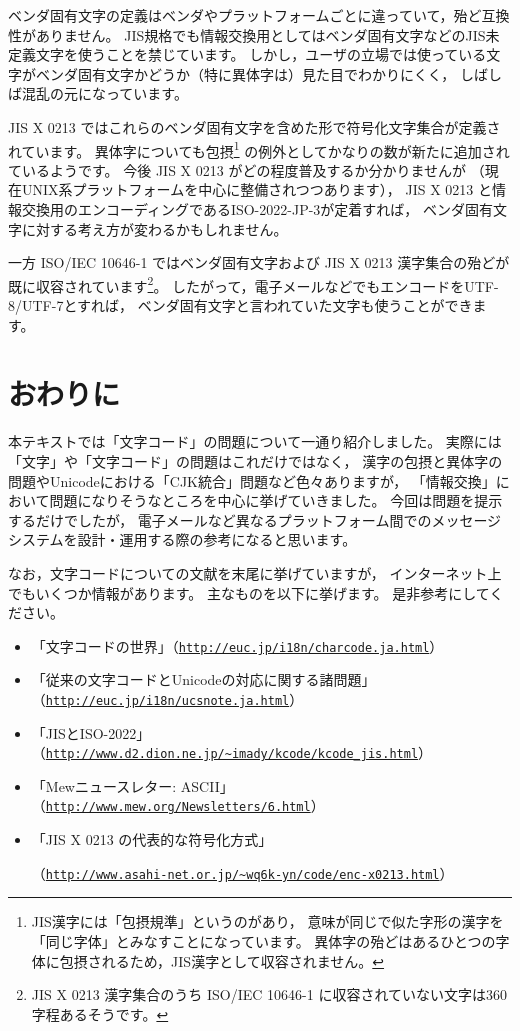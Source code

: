 \documentclass[a4j,10pt,fleqn]{jsarticle}
\begin{document}
ベンダ固有文字の定義はベンダやプラットフォームごとに違っていて，殆ど互換性がありません。
JIS規格でも情報交換用としてはベンダ固有文字などのJIS未定義文字を使うことを禁じています。
しかし，ユーザの立場では使っている文字がベンダ固有文字かどうか（特に異体字は）見た目でわかりにくく，
しばしば混乱の元になっています。

JIS X 0213 ではこれらのベンダ固有文字を含めた形で符号化文字集合が定義されています。
異体字についても包摂\footnote{
    JIS漢字には「包摂規準」というのがあり，
    意味が同じで似た字形の漢字を「同じ字体」とみなすことになっています。
    異体字の殆どはあるひとつの字体に包摂されるため，JIS漢字として収容されません。
} の例外としてかなりの数が新たに追加されているようです。
今後 JIS X 0213 がどの程度普及するか分かりませんが
（現在UNIX系プラットフォームを中心に整備されつつあります），
JIS X 0213 と情報交換用のエンコーディングであるISO-2022-JP-3が定着すれば，
ベンダ固有文字に対する考え方が変わるかもしれません。

一方 ISO/IEC 10646-1 ではベンダ固有文字および JIS X 0213 漢字集合の殆どが既に収容されています\footnote{
    JIS X 0213 漢字集合のうち ISO/IEC 10646-1 に収容されていない文字は360字程あるそうです。
}。
したがって，電子メールなどでもエンコードをUTF-8/UTF-7とすれば，
ベンダ固有文字と言われていた文字も使うことができます。


\section{おわりに}

本テキストでは「文字コード」の問題について一通り紹介しました。
実際には「文字」や「文字コード」の問題はこれだけではなく，
漢字の包摂と異体字の問題やUnicodeにおける「CJK統合」問題など色々ありますが，
「情報交換」において問題になりそうなところを中心に挙げていきました。
今回は問題を提示するだけでしたが，
電子メールなど異なるプラットフォーム間でのメッセージシステムを設計・運用する際の参考になると思います。

なお，文字コードについての文献を末尾に挙げていますが，
インターネット上でもいくつか情報があります。
主なものを以下に挙げます。
是非参考にしてください。
\begin{itemize}
\item 「文字コードの世界」（\href{http://euc.jp/i18n/charcode.ja.html}{\texttt{http://euc.jp/i18n/charcode.ja.html}}）
\item 「従来の文字コードとUnicodeの対応に関する諸問題」（\href{http://euc.jp/i18n/ucsnote.ja.html}{\texttt{http://euc.jp/i18n/ucsnote.ja.html}}）
\item 「JISとISO-2022」（\href{http://www.d2.dion.ne.jp/~imady/kcode/kcode_jis.html}{\texttt{http://www.d2.dion.ne.jp/\~{}imady/kcode/kcode\_jis.html}}）
\item 「Mewニュースレター: ASCII」（\href{http://www.mew.org/Newsletters/6.html}{\texttt{http://www.mew.org/Newsletters/6.html}}）
\item 「JIS X 0213 の代表的な符号化方式」\par
    （\href{http://www.asahi-net.or.jp/~wq6k-yn/code/enc-x0213.html}{\texttt{http://www.asahi-net.or.jp/\~{}wq6k-yn/code/enc-x0213.html}}）
\end{itemize}


\nocite{Book:JISHandbook}\nocite{Book:CharCode}\nocite{Book:CharCode2}




\end{document}
